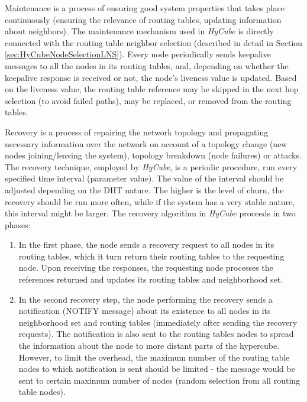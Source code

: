 Maintenance is a process of ensuring good system properties that takes place continuously (ensuring the relevance of routing tables, updating information about neighbors). The maintenance mechanism used in \emph{HyCube} is directly connected with the routing table neighbor selection (described in detail in Section \ref{sec:HyCubeNodeSelectionLNS}). Every node periodically sends keepalive messages to all the nodes in its routing tables, and, depending on whether the keepalive response is received or not, the node's liveness value is updated. Based on the liveness value, the routing table reference may be skipped in the next hop selection (to avoid failed paths), may be replaced, or removed from the routing tables.

Recovery is a process of repairing the network topology and propagating necessary information over the network on account of a topology change (new nodes joining/leaving the system), topology breakdown (node failures) or attacks. The recovery technique, employed by \emph{HyCube}, is a periodic procedure, run every specified time interval (parameter value). The value of the interval should be adjusted depending on the DHT nature. The higher is the level of churn, the recovery should be run more often, while if the system has a very stable nature, this interval might be larger. The recovery algorithm in \emph{HyCube} proceeds in two phases:

\begin{enumerate}

\item In the first phase, the node sends a recovery request to all nodes in its routing tables, which it turn return their routing tables to the requesting node. Upon receiving the responses, the requesting node processes the references returned and updates its routing tables and neighborhood set.

\item In the second recovery step, the node performing the recovery sends a notification (NOTIFY message) about its existence to all nodes in its neighborhood set and routing tables (immediately after sending the recovery requests). The notification is also sent to the routing tables nodes to spread the information about the node to more distant parts of the hypercube. However, to limit the overhead, the maximum number of the routing table nodes to which notification is sent should be limited - the message would be sent to certain maximum number of nodes (random selection from all routing table nodes).

\end{enumerate}


